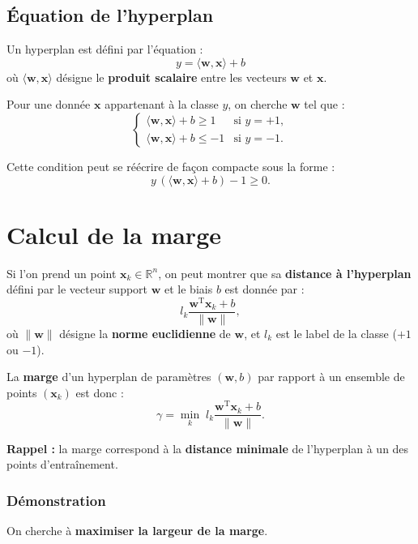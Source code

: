 \subsection*{Équation de l’hyperplan}
Un hyperplan est défini par l’équation :
\[
y = \langle \mathbf{w}, \mathbf{x} \rangle + b
\]
où \(\langle \mathbf{w}, \mathbf{x} \rangle\) désigne le \textbf{produit scalaire}
entre les vecteurs \(\mathbf{w}\) et \(\mathbf{x}\).

Pour une donnée \(\mathbf{x}\) appartenant à la classe \(y\), on cherche \(\mathbf{w}\)
tel que :
\[
\begin{cases}
\langle \mathbf{w}, \mathbf{x} \rangle + b \ge 1 & \text{si } y = +1,\\
\langle \mathbf{w}, \mathbf{x} \rangle + b \le -1 & \text{si } y = -1.
\end{cases}
\]

Cette condition peut se réécrire de façon compacte sous la forme :
\[
y \, (\langle \mathbf{w}, \mathbf{x} \rangle + b) - 1 \ge 0.
\]

\section{Calcul de la marge}

Si l’on prend un point \(\mathbf{x}_k \in \mathbb{R}^n\), on peut montrer que sa
\textbf{distance à l’hyperplan} défini par le vecteur support \(\mathbf{w}\) et le
biais \(b\) est donnée par :
\[
l_k \frac{\mathbf{w}^\mathrm{T} \mathbf{x}_k + b}{\|\mathbf{w}\|},
\]
où \(\|\mathbf{w}\|\) désigne la \textbf{norme euclidienne} de \(\mathbf{w}\), et
\(l_k\) est le label de la classe (\(+1\) ou \(-1\)).

La \textbf{marge} d’un hyperplan de paramètres \((\mathbf{w}, b)\) par rapport à
un ensemble de points \((\mathbf{x}_k)\) est donc :
\[
\gamma = \min_k \; l_k \frac{\mathbf{w}^\mathrm{T} \mathbf{x}_k + b}{\|\mathbf{w}\|}.
\]

\textbf{Rappel :} la marge correspond à la \textbf{distance minimale} de
l’hyperplan à un des points d’entraînement.

\subsubsection*{Démonstration}

On cherche à \textbf{maximiser la largeur de la marge}.  

